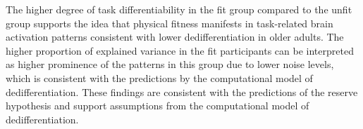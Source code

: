\noindent The higher degree of task differentiability in the fit group compared to the unfit group supports the idea that physical fitness manifests in task-related brain activation patterns consistent with lower dedifferentiation in older adults. The higher proportion of explained variance in the fit participants can be interpreted as higher prominence of the patterns in this group due to lower noise levels, which is consistent with the predictions by the computational model of dedifferentiation. These findings are consistent with the predictions of the reserve hypothesis and support assumptions from the computational model of dedifferentiation.

